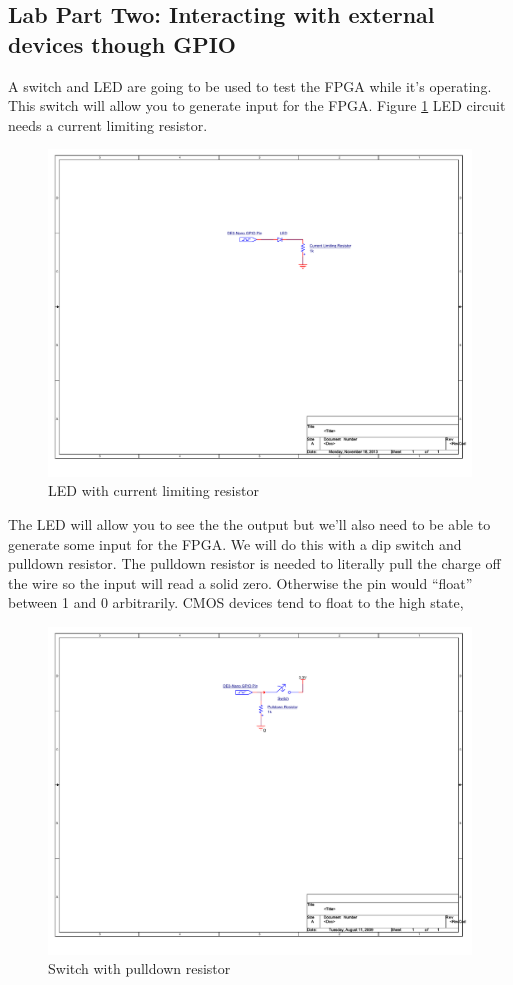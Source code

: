     \subsection{Lab Part Two: Interacting with external devices though GPIO}
      A switch and LED are going to be used to test the FPGA while it's operating. This switch will allow you to generate input for the FPGA. Figure \ref{LEDCircuit} LED circuit needs a current limiting resistor.
      \begin{figure}[htpb]
        \includegraphics[width=.48\textwidth]{Schematics/LED.pdf}
        \caption{LED with current limiting resistor}
        \label{LEDCircuit}
      \end{figure}
      The LED will allow you to see the the output but we'll also need to be able to generate some input for the FPGA. We will do this with a dip switch and pulldown resistor. The pulldown resistor is needed to literally pull the charge off the wire so the input will read a solid zero. Otherwise the pin would ``float'' between 1 and 0 arbitrarily. CMOS devices tend to float to the high state, 

      \begin{figure}[htpb]
        \includegraphics[width=.38\textwidth]{Schematics/SwitchCircuit.pdf}
        \caption{Switch with pulldown resistor}
        \label{swPulldown}
      \end{figure}

